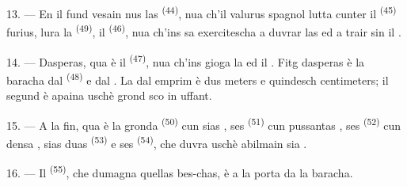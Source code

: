 13. --- En il fund vesain nus las  \textsuperscript{(44)}, nua ch'il
valurus  spagnol lutta cunter il  \textsuperscript{(45)}
furius, lura la  \textsuperscript{(49)}, il 
\textsuperscript{(46)}, nua ch'ins sa exercitescha a duvrar las  ed a trair sin il .

14. --- Dasperas, qua è il  \textsuperscript{(47)}, nua ch'ins
gioga la  ed il . Fitg dasperas è la baracha dal
 \textsuperscript{(48)} e dal . La  dal
emprim è dus meters e quindesch centimeters; il segund è apaina uschè grond sco in
uffant.

15. --- A la fin, qua è la gronda  \textsuperscript{(50)} cun sias
, ses  \textsuperscript{(51)} cun pussantas
, ses  \textsuperscript{(52)} cun densa ,
sias duas  \textsuperscript{(53)} e ses 
\textsuperscript{(54)}, che duvra uschè abilmain sia .

16. --- Il  \textsuperscript{(55)}, che dumagna quellas bes-chas, è
a la porta da la baracha.

\VUsaut{6.0mm}
\VUfilet{22mm}

